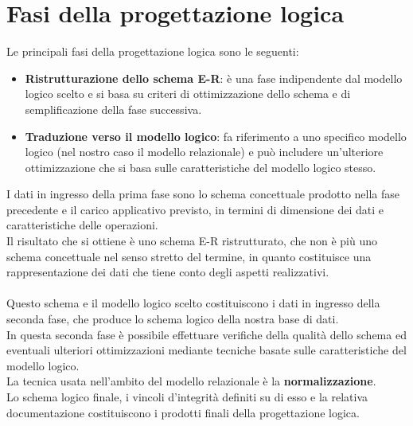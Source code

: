 \section{Fasi della progettazione logica}
Le principali fasi della progettazione logica sono le seguenti:
    \begin{itemize}
        \item{\textbf{Ristrutturazione dello schema E-R}: è una fase indipendente dal modello logico scelto e si basa su criteri di ottimizzazione dello schema e di semplificazione della fase successiva.}
        \item{\textbf{Traduzione verso il modello logico}: fa riferimento a uno specifico modello logico (nel nostro caso il modello relazionale) e può includere un'ulteriore ottimizzazione che si basa sulle caratteristiche del modello logico stesso.}
    \end{itemize}
I dati in ingresso della prima fase sono lo schema concettuale prodotto nella fase precedente e il carico applicativo previsto, in termini di dimensione dei dati e caratteristiche delle operazioni.\\
Il risultato che si ottiene è uno schema E-R ristrutturato, che non è più uno schema concettuale nel senso stretto del termine, in quanto costituisce una rappresentazione dei dati che tiene conto degli aspetti realizzativi.\\\\
Questo schema e il modello logico scelto costituiscono i dati in ingresso della seconda fase, che produce lo schema logico della nostra base di dati.\\
In questa seconda fase è possibile effettuare verifiche della qualità dello schema ed eventuali ulteriori ottimizzazioni mediante tecniche basate sulle caratteristiche del modello logico.\\
La tecnica usata nell'ambito del modello relazionale è la \textbf{normalizzazione}.\\
Lo schema logico finale, i vincoli d'integrità definiti su di esso e la relativa documentazione costituiscono i prodotti finali della progettazione logica.



